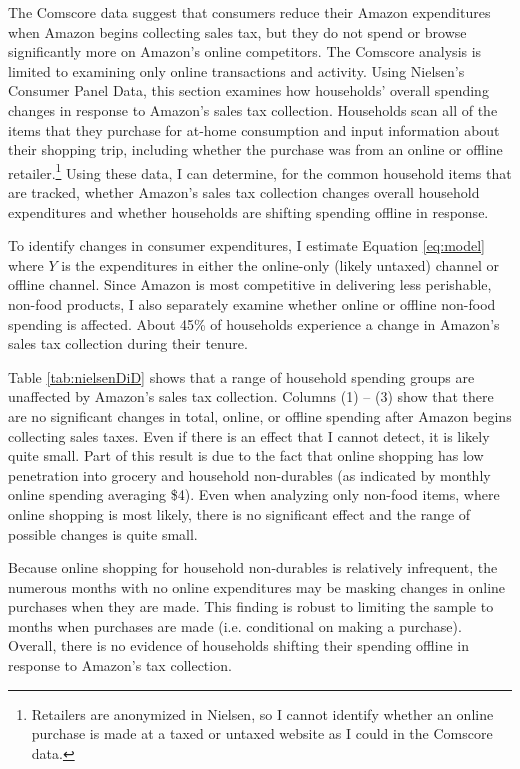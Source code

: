 \documentclass[AEJ,reviewmode]{AEA}
\begin{document}
The Comscore data suggest that consumers reduce their Amazon expenditures when Amazon begins collecting sales tax, but they do not spend or browse significantly more on Amazon's online competitors. The Comscore analysis is limited to examining only online transactions and activity. Using Nielsen's Consumer Panel Data, this section examines how households' overall spending changes in response to Amazon's sales tax collection. Households scan all of the items that they purchase for at-home consumption and input information about their shopping trip, including whether the purchase was from an online or offline retailer.\footnote{Retailers are anonymized in Nielsen, so I cannot identify whether an online purchase is made at a taxed or untaxed website as I could in the Comscore data.} Using these data, I can determine, for the common household items that are tracked, whether Amazon's sales tax collection changes overall household expenditures and whether households are shifting spending offline in response.

To identify changes in consumer expenditures, I estimate Equation \ref{eq:model} where $Y$ is the expenditures in either the online-only (likely untaxed) channel or offline channel. Since Amazon is most competitive in delivering less perishable, non-food products, I also separately examine whether online or offline non-food spending is affected. About 45\% of households experience a change in Amazon's sales tax collection during their tenure.



Table \ref{tab:nielsenDiD} shows that a range of household spending groups are unaffected by Amazon's sales tax collection. Columns (1) -- (3) show that there are no significant changes in total, online, or offline spending after Amazon begins collecting sales taxes. Even if there is an effect that I cannot detect, it is likely quite small. Part of this result is due to the fact that online shopping has low penetration into grocery and household non-durables (as indicated by monthly online spending averaging \$4). Even when analyzing only non-food items, where online shopping is most likely, there is no significant effect and the range of possible changes is quite small.

Because online shopping for household non-durables is relatively infrequent, the numerous months with no online expenditures may be masking changes in online purchases when they are made. This finding is robust to limiting the sample to  months when purchases are made (i.e. conditional on making a purchase). Overall, there is no evidence of households shifting their spending offline in response to Amazon's tax collection.
\end{document}
